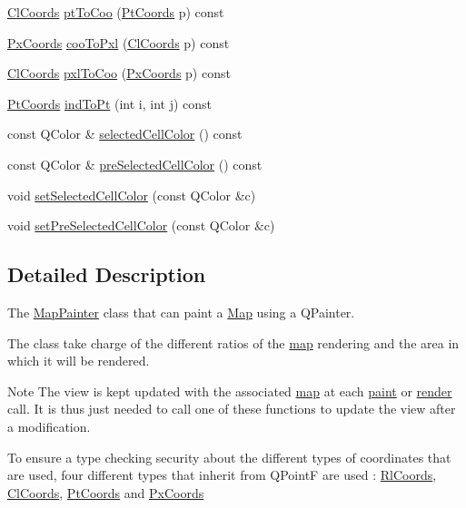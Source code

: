 \begin{DoxyCompactItemize}
\hyperlink{class_cl_coords}{\-Cl\-Coords} \hyperlink{class_map_painter_a00f55d40c322ff5f2038a6515423f9f1}{pt\-To\-Coo} (\hyperlink{class_pt_coords}{\-Pt\-Coords} p) const 
\item 
\hyperlink{class_px_coords}{\-Px\-Coords} \hyperlink{class_map_painter_a4162990e1c9ed17877c0f5a7ad33f606}{coo\-To\-Pxl} (\hyperlink{class_cl_coords}{\-Cl\-Coords} p) const 
\item 
\hyperlink{class_cl_coords}{\-Cl\-Coords} \hyperlink{class_map_painter_a8f14b86f89dabf7183ae960284aaf0b5}{pxl\-To\-Coo} (\hyperlink{class_px_coords}{\-Px\-Coords} p) const 
\item 
\hyperlink{class_pt_coords}{\-Pt\-Coords} \hyperlink{class_map_painter_a1902b1ee672739e47d52a82c4fe3c657}{ind\-To\-Pt} (int i, int j) const 
\item 
const \-Q\-Color \& \hyperlink{class_map_painter_aeb9f8f1f8024a910eb23502189cf911e}{selected\-Cell\-Color} () const 
\item 
const \-Q\-Color \& \hyperlink{class_map_painter_a16c1476ffc1b42de1e3e999ff05f6895}{pre\-Selected\-Cell\-Color} () const 
\item 
void \hyperlink{class_map_painter_ad1658d299eaee7ccdad70f00ad3f76d8}{set\-Selected\-Cell\-Color} (const \-Q\-Color \&c)
\item 
void \hyperlink{class_map_painter_a1c57806b863cd4b83051033681421cf6}{set\-Pre\-Selected\-Cell\-Color} (const \-Q\-Color \&c)
\end{DoxyCompactItemize}


\subsection{\-Detailed \-Description}
\-The \hyperlink{class_map_painter}{\-Map\-Painter} class that can paint a \hyperlink{class_map}{\-Map} using a \-Q\-Painter. 

\-The class take charge of the different ratios of the \hyperlink{class_map}{map} rendering and the area in which it will be rendered.

\begin{DoxyNote}{\-Note}
\-The view is kept updated with the associated \hyperlink{class_map}{map} at each \hyperlink{class_map_painter_a0deb552b94eff8f8751946928d7cd5b8}{paint} or \hyperlink{class_map_painter_a1c20cf03d0376290481bd80b9f8ef013}{render} call. \-It is thus just needed to call one of these functions to update the view after a modification.
\end{DoxyNote}
\-To ensure a type checking security about the different types of coordinates that are used, four different types that inherit from \-Q\-Point\-F are used \-: \hyperlink{class_rl_coords}{\-Rl\-Coords}, \hyperlink{class_cl_coords}{\-Cl\-Coords}, \hyperlink{class_pt_coords}{\-Pt\-Coords} and \hyperlink{class_px_coords}{\-Px\-Coords} 

